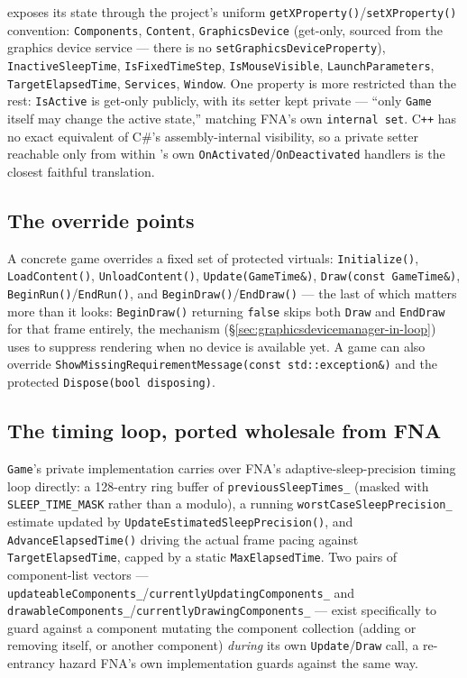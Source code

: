  exposes its state through the project's uniform
\texttt{getXProperty()}/\texttt{setXProperty()} convention: \texttt{Components},
\texttt{Content}, \texttt{GraphicsDevice} (get-only, sourced from the graphics device
service --- there is no \texttt{setGraphicsDeviceProperty}), \texttt{InactiveSleepTime},
\texttt{IsFixedTimeStep}, \texttt{IsMouseVisible}, \texttt{LaunchParameters},
\texttt{TargetElapsedTime}, \texttt{Services}, \texttt{Window}. One property is more
restricted than the rest: \texttt{IsActive} is get-only publicly, with its setter kept
private --- ``only \texttt{Game} itself may change the active state,'' matching FNA's own
\texttt{internal set}. C\texttt{++} has no exact equivalent of C\#'s assembly-internal
visibility, so a private setter reachable only from within 's own
\texttt{OnActivated}/\texttt{OnDeactivated} handlers is the closest faithful translation.

\subsection{The override points}

A concrete game overrides a fixed set of protected virtuals: \texttt{Initialize()},
\texttt{LoadContent()}, \texttt{UnloadContent()}, \texttt{Update(GameTime\&)},
\texttt{Draw(const GameTime\&)}, \texttt{BeginRun()}/\texttt{EndRun()}, and
\texttt{BeginDraw()}/\texttt{EndDraw()} --- the last of which matters more than it looks:
\texttt{BeginDraw()} returning \texttt{false} skips both \texttt{Draw} and \texttt{EndDraw}
for that frame entirely, the mechanism 
(\S\ref{sec:graphicsdevicemanager-in-loop}) uses to suppress rendering when no device is
available yet. A game can also override \texttt{ShowMissingRequirementMessage(const
std::exception\&)} and the protected \texttt{Dispose(bool disposing)}.

\subsection{The timing loop, ported wholesale from FNA}

\texttt{Game}'s private implementation carries over FNA's adaptive-sleep-precision timing
loop directly: a 128-entry ring buffer of \texttt{previousSleepTimes\_} (masked with
\texttt{SLEEP\_TIME\_MASK} rather than a modulo), a running
\texttt{worstCaseSleepPrecision\_} estimate updated by \texttt{UpdateEstimatedSleepPrecision()},
and \texttt{AdvanceElapsedTime()} driving the actual frame pacing against
\texttt{TargetElapsedTime}, capped by a static \texttt{MaxElapsedTime}. Two pairs of
component-list vectors --- \texttt{updateableComponents\_}/\texttt{currentlyUpdatingComponents\_}
and \texttt{drawableComponents\_}/\texttt{currentlyDrawingComponents\_} --- exist specifically
to guard against a component mutating the component collection (adding or removing itself, or
another component) \emph{during} its own \texttt{Update}/\texttt{Draw} call, a re-entrancy
hazard FNA's own implementation guards against the same way.

